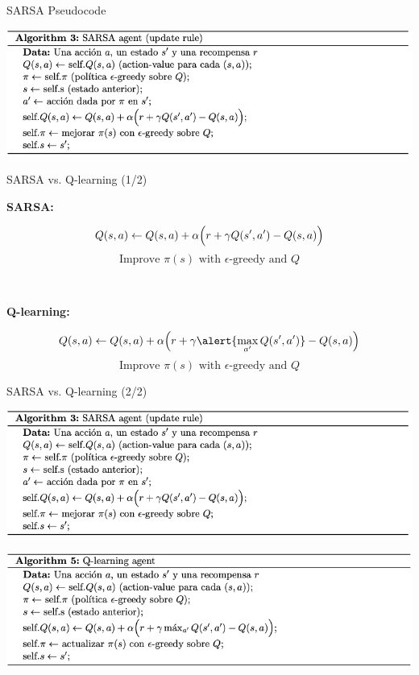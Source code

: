 \documentclass[11pt]{beamer}
\begin{document}
\begin{frame}{SARSA Pseudocode}

\begin{center}
\includegraphics[width=.95\linewidth]{images/sarsa_agent}
\end{center}

\end{frame}

\begin{frame}{SARSA vs. Q-learning (1/2)}

\textbf{SARSA:}

\[
Q(s,a) \gets Q(s,a) + \alpha\Bigl(r + \gamma Q(s',a') - Q(s,a)\Bigr)
\]
\[
\mbox{Improve $\pi(s)$ with $\epsilon$-greedy and $Q$}
\]

\

\textbf{Q-learning:}

\[
Q(s,a) \gets Q(s,a) + \alpha\Bigl(r + \gamma \alert{\max_{a'}Q(s',a')} - Q(s,a)\Bigr)
\]
\[
\mbox{Improve $\pi(s)$ with $\epsilon$-greedy and $Q$}
\]

\end{frame}

\begin{frame}{SARSA vs. Q-learning (2/2)}

\vspace{.5\baselineskip}

\begin{center}
\includegraphics[width=.85\linewidth]{images/sarsa_agent}
\end{center}

\vfill

\begin{center}
\includegraphics[width=.85\linewidth]{images/q_learning_agent}
\end{center}

\vspace{.5\baselineskip}

\end{frame}
\end{document}
